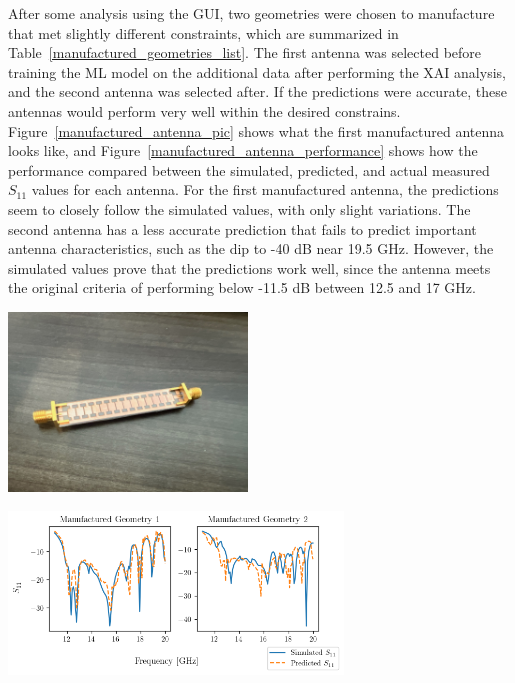 \documentclass[conference]{IEEEtran}
\newenvironment{Figure}
    {\par\medskip\noindent\minipage{\linewidth}}
    {\endminipage\par\medskip}
\begin{document}
After some analysis using the GUI, two geometries were chosen to manufacture that met slightly different constraints, which are summarized in Table~\ref{manufactured_geometries_list}. The first antenna was selected before training the ML model on the additional data after performing the XAI analysis, and the second antenna was selected after. If the predictions were accurate, these antennas would perform very well within the desired constrains. Figure~\ref{manufactured_antenna_pic} shows what the first manufactured antenna looks like, and Figure~\ref{manufactured_antenna_performance} shows how the performance compared between the simulated, predicted, and actual measured $S_{11}$ values for each antenna. For the first manufactured antenna, the predictions seem to closely follow the simulated values, with only slight variations. The second antenna has a less accurate prediction that fails to predict important antenna characteristics, such as the dip to -40 dB near 19.5 GHz. However, the simulated values prove that the predictions work well, since the antenna meets the original criteria of performing below -11.5 dB between 12.5 and 17 GHz. 


\begin{Figure}
    \centering
    \includegraphics[width=2.5in]{manufactured_antenna}
    \label{manufactured_antenna_pic}
\end{Figure} 

\begin{Figure}
    \centering
    \includegraphics[width=3.5in]{manufactured_antenna_performance}
    \label{manufactured_antenna_performance}
\end{Figure} 
\end{document}
